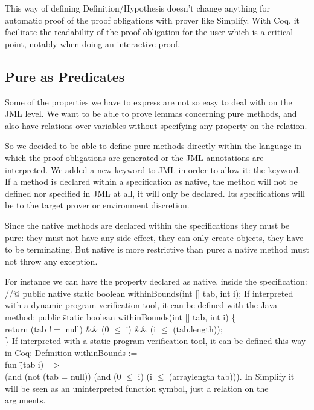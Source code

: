 This way of defining Definition/Hypothesis doesn't change anything 
for automatic proof of the proof obligations with prover like Simplify. 
With Coq,
it facilitate the readability of the proof obligation for the user which 
is a critical point, notably when doing an interactive proof.

\subsection{Pure as Predicates}
Some of the properties we have to express are not so easy to deal with 
on the JML level. 
We want to be able to prove lemmas concerning pure methods, and also have 
relations over  variables without specifying any property on the relation. 

So we decided to be able to define pure methods directly within 
the language in which the proof 
obligations are generated or the JML annotations are interpreted. 
We added a new keyword to JML in order to allow it: the  keyword. 
If a method is declared within a specification as native, the method 
will not be defined nor specified
 in JML at all, it will only be declared. Its specifications will be 
to the target prover or environment discretion.

Since the native methods are declared within the specifications they must 
be pure: they must not have any side-effect, they can only create objects, 
they have to be terminating. 
But native is more restrictive than pure: 
a native method must not throw any exception.


For instance we can have the property  declared as native, 
inside the specification:
\btab
//@ public native static boolean withinBounds(int [] tab, int i); 
\etab
If interpreted with a dynamic program verification tool, it
can be defined with the Java method:
\btab
public \= static boolean withinBounds(int [] tab, int i) \{\+\\
    return (tab $!=$ null) \&\& (0 $\le$ i) \&\& (i $\le$ (tab.length));\-\\
\}
\etab
If interpreted with a static program verification tool,
it can be defined this way in Coq:
\btab
Def\=inition withinBounds := \+\\
fun \= (tab i) =>\+\\
       (and (not (tab = null)) (and (0 $\le$ i) (i $\le$ (arraylength tab))).
\etab
In Simplify it will be seen as an uninterpreted function symbol, 
just a relation on the arguments.

